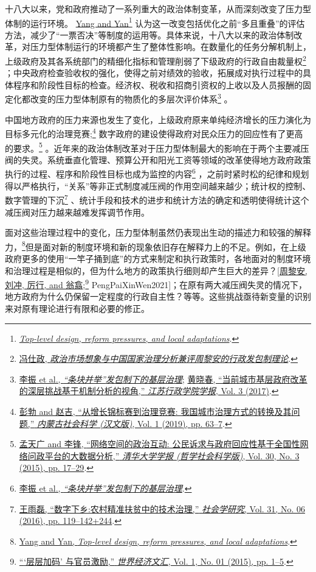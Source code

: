 \documentclass[
  12pt,
]{ctexart}
\begin{document}
十八大以来，党和政府推动了一系列重大的政治体制变革，从而深刻改变了压力型体制的运行环境。 \protect\hyperlink{ref-YangYan2018}{Yang and Yan}\footnote{\protect\hyperlink{ref-YangYan2018}{\emph{Top-level design, reform pressures, and local adaptations}}.} 认为这一改变包括优化之前``多且重叠''的评估方法，减少了``一票否决''等制度的运用等。具体来说，十八大以来的政治体制改革，对压力型体制运行的环境都产生了整体性影响。在数量化的任务分解机制上，上级政府及其各系统部门的精细化指标和管理削弱了下级政府的行政自由裁量权\footnote{\protect\hyperlink{ref-FengShiZheng2014}{冯仕政, \emph{政治市场想象与中国国家治理分析\textemdash\textemdash 兼评周黎安的行政发包制理论}}.} ；中央政府检查验收权的强化，使得之前对绩效的验收，拓展成对执行过程中的具体程序和阶段性目标的检查。经济权、税收和招商引资权的上收以及人员报酬的固定化都改变的压力型体制原有的物质化的多层次评价体系\footnote{\protect\hyperlink{ref-LiZhenEtAl2020}{李振 et al., \emph{{``条块并举''}发包制下的基层治理\textemdash{}}}; \protect\hyperlink{ref-HuangXiaoChun2017}{黄晓春, {``当前城市基层政府改革的深层挑战\textemdash\textemdash 基于机制分析的视角,''} \emph{江苏行政学院学报}, Vol. 3 (2017)}.} 。

中国地方政府的压力来源也发生了变化，上级政府原来单纯经济增长的压力演化为目标多元化的治理竞赛;\footnote{\protect\hyperlink{ref-PengBoZhaoJi2019}{彭勃 and 赵吉, {``从增长锦标赛到治理竞赛: 我国城市治理方式的转换及其问题,''} \emph{内蒙古社会科学 (汉文版)}, Vol. 1 (2019), pp. 63--7}.} 数字政府的建设使得政府对民众压力的回应性有了更高的要求。\footnote{\protect\hyperlink{ref-MengTianGuangLiFeng2015}{孟天广 and 李锋, {``网络空间的政治互动: 公民诉求与政府回应性\textemdash\textemdash 基于全国性网络问政平台的大数据分析,''} \emph{清华大学学报 (哲学社会科学版)}, Vol. 30, No. 3 (2015), pp. 17--29}.} 。近年来的政治体制改革对于压力型体制最大的影响在于两个主要减压阀的失灵。系统垂直化管理、预算公开和阳光工资等领域的改革使得地方政府政策执行的过程、程序和阶段性目标也成为监控的内容\footnote{\protect\hyperlink{ref-LiZhenEtAl2020}{李振 et al., \emph{{``条块并举''}发包制下的基层治理\textemdash{}}}.} ，之前时紧时松的纪律和规划得以严格执行，``关系''等非正式制度减压阀的作用空间越来越少；统计权的控制、数字管理的下沉\footnote{\protect\hyperlink{ref-WangYuLei2016}{王雨磊, {``数字下乡:农村精准扶贫中的技术治理,''} \emph{社会学研究}, Vol. 31, No. 06 (2016), pp. 119--142+244}.} 、统计手段和技术的进步和统计方法的确定和透明使得统计这个减压阀对压力越来越难发挥调节作用。

面对这些治理过程中的变化，压力型体制虽然仍表现出生动的描述力和较强的解释力，\footnote{\protect\hyperlink{ref-YangYan2018}{Yang and Yan, \emph{Top-level design, reform pressures, and local adaptations}}.}但是面对新的制度环境和新的现象依旧存在解释力上的不足。例如，在上级政府更多的使用``一竿子捅到底''的方式来制定和执行政策时，各地面对的制度环境和治理过程是相似的，但为什么地方的政策执行细则却产生巨大的差异？{[}\protect\hyperlink{ref-ZhouLiAnEtAl2015}{周黎安, 刘冲, 厉行, and 翁翕};\footnote{\protect\hyperlink{ref-ZhouLiAnEtAl2015}{{``{`层层加码'} 与官员激励,''} \emph{世界经济文汇}, Vol. 1, No. 01 (2015), pp. 1--5}.} PengPaiXinWen2021{]}；在原有两大减压阀失灵的情况下，地方政府为什么仍保留一定程度的行政自主性？等等。这些挑战亟待新变量的识别来对原有理论进行有限和必要的修正。
\end{document}

